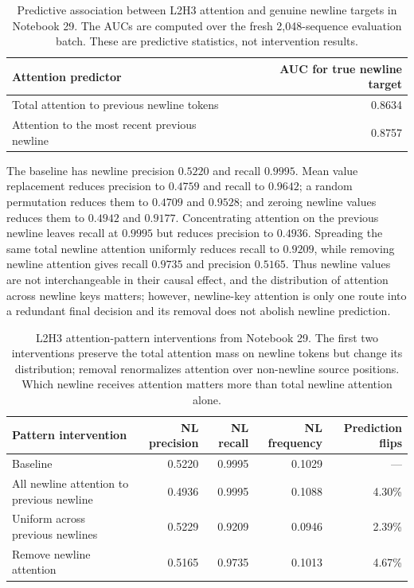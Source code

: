 \documentclass[11pt]{article}
\begin{document}
\begin{table}[t]
\centering
\small
\begin{tabular}{lr}
\toprule
Attention predictor & AUC for true newline target \\
\midrule
Total attention to previous newline tokens & 0.8634 \\
Attention to the most recent previous newline & 0.8757 \\
\bottomrule
\end{tabular}
\caption{Predictive association between L2H3 attention and genuine newline
targets in Notebook 29.  The AUCs are computed over the fresh 2,048-sequence
evaluation batch.  These are predictive statistics, not intervention results.}
\label{tab:head3-attention-true-target-auc}
\end{table}

The baseline has newline precision $0.5220$ and recall $0.9995$. Mean value
replacement reduces precision to $0.4759$ and recall to $0.9642$; a random
permutation reduces them to $0.4709$ and $0.9528$; and zeroing newline values
reduces them to $0.4942$ and $0.9177$. Concentrating attention on the
previous newline leaves recall at $0.9995$ but reduces precision to $0.4936$.
Spreading the same total newline attention uniformly reduces recall to
$0.9209$, while removing newline attention gives recall $0.9735$ and
precision $0.5165$. Thus newline values are not interchangeable in their
causal effect, and the distribution of attention across newline keys matters;
however, newline-key attention is only one route into a redundant final
decision and its removal does not abolish newline prediction.

\begin{table}[t]
\centering
\small
\begin{tabular}{lrrrr}
\toprule
Pattern intervention & NL precision & NL recall & NL frequency & Prediction flips \\
\midrule
Baseline & 0.5220 & 0.9995 & 0.1029 & --- \\
All newline attention to previous newline & 0.4936 & 0.9995 & 0.1088 & 4.30\% \\
Uniform across previous newlines & 0.5229 & 0.9209 & 0.0946 & 2.39\% \\
Remove newline attention & 0.5165 & 0.9735 & 0.1013 & 4.67\% \\
\bottomrule
\end{tabular}
\caption{L2H3 attention-pattern interventions from Notebook 29.  The first
two interventions preserve the total attention mass on newline tokens but
change its distribution; removal renormalizes attention over non-newline
source positions.  Which newline receives attention matters more than total
newline attention alone.}
\label{tab:head3-pattern-interventions}
\end{table}
\end{document}
